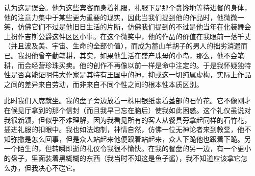 认为这是误会。他为这些宾客而身着礼服，礼服下是那个贪馋地等待进餐的身体，他的注意力集中于某些更为重要的现实，因此当我们提到他的作品时，他微微一笑，仿佛它们不过是他旧日生活的片断，仿佛我们提到的不过是他当年在化装舞会上扮作吉斯公爵这件区区小事。在这个微笑中，他的作品的价值在我眼前一落千丈（并且波及美、宇宙、生命的全部价值），而成为蓄山羊胡子的男人的拙劣消遣而已。我想他曾辛勤笔耕，其实，如果他生活在盛产珠母的小岛，那么，他不会笔耕，而会经营珍珠买卖。他的创作不再像以前一样是命中注定的。于是我怀疑独特性是否真能证明伟大作家是其特有王国中的神，抑或这一切纯属虚构，实际上作品之间的差异来自劳动，而非来自不同个性之间的根本性本质区别。
\par 此时我们入席就坐。我的盘子旁边放着一株用银纸裹着茎部的石竹花。它不像刚才在候见厅拿到的那个信封（而且我早已忘在脑后）使我如此困惑。这个礼仪虽说对我很新颖，但似乎不难理解，因为我看见所有的客人从餐具旁拿起同样的石竹花，插进礼服的扣眼中。我也如法炮制，神情自然，仿佛一位无神论者来到教堂，他不知弥撒是怎么回事，但是众人站起来他便跟着站起来，众人下跪他也跟着下跪。另一个陌生的，但转瞬即逝的礼仪令我很不愉快。在我的餐盘的另一边，有一个更小的盘子，里面装着黑糊糊的东西（我当时不知这是鱼子酱），我不知道应该拿它怎么办，但我决心不碰它。
